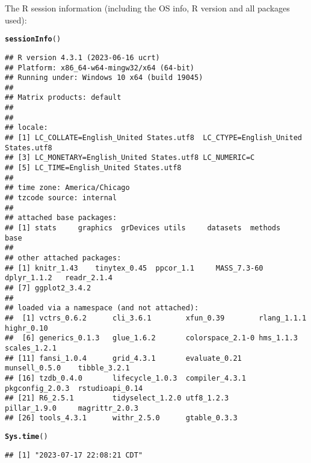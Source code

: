\documentclass{article}\usepackage[]{graphicx}\usepackage[]{xcolor}
\makeatletter
\newcommand{\hlstd}[1]{\textcolor[rgb]{0.345,0.345,0.345}{#1}}%
\newcommand{\hlkwd}[1]{\textcolor[rgb]{0.737,0.353,0.396}{\textbf{#1}}}%
\newenvironment{kframe}{%
 \def\at@end@of@kframe{}%
 \ifinner\ifhmode%
  \def\at@end@of@kframe{\end{minipage}}%
  \begin{minipage}{\columnwidth}%
 \fi\fi%
 \def\FrameCommand##1{\hskip\@totalleftmargin \hskip-\fboxsep
 \colorbox{shadecolor}{##1}\hskip-\fboxsep
     \hskip-\linewidth \hskip-\@totalleftmargin \hskip\columnwidth}%
 \MakeFramed {\advance\hsize-\width
   \@totalleftmargin\z@ \linewidth\hsize
   \@setminipage}}%
 {\par\unskip\endMakeFramed%
 \at@end@of@kframe}
\newenvironment{knitrout}{}{} %
\makeatother
\begin{document}
The R session information (including the OS info, R version and all
packages used):

\begin{knitrout}
\color{fgcolor}\begin{kframe}
\begin{alltt}
\hlkwd{sessionInfo}\hlstd{()}
\end{alltt}
\begin{verbatim}
## R version 4.3.1 (2023-06-16 ucrt)
## Platform: x86_64-w64-mingw32/x64 (64-bit)
## Running under: Windows 10 x64 (build 19045)
## 
## Matrix products: default
## 
## 
## locale:
## [1] LC_COLLATE=English_United States.utf8  LC_CTYPE=English_United States.utf8   
## [3] LC_MONETARY=English_United States.utf8 LC_NUMERIC=C                          
## [5] LC_TIME=English_United States.utf8    
## 
## time zone: America/Chicago
## tzcode source: internal
## 
## attached base packages:
## [1] stats     graphics  grDevices utils     datasets  methods   base     
## 
## other attached packages:
## [1] knitr_1.43    tinytex_0.45  ppcor_1.1     MASS_7.3-60   dplyr_1.1.2   readr_2.1.4  
## [7] ggplot2_3.4.2
## 
## loaded via a namespace (and not attached):
##  [1] vctrs_0.6.2      cli_3.6.1        xfun_0.39        rlang_1.1.1      highr_0.10      
##  [6] generics_0.1.3   glue_1.6.2       colorspace_2.1-0 hms_1.1.3        scales_1.2.1    
## [11] fansi_1.0.4      grid_4.3.1       evaluate_0.21    munsell_0.5.0    tibble_3.2.1    
## [16] tzdb_0.4.0       lifecycle_1.0.3  compiler_4.3.1   pkgconfig_2.0.3  rstudioapi_0.14 
## [21] R6_2.5.1         tidyselect_1.2.0 utf8_1.2.3       pillar_1.9.0     magrittr_2.0.3  
## [26] tools_4.3.1      withr_2.5.0      gtable_0.3.3
\end{verbatim}
\begin{alltt}
\hlkwd{Sys.time}\hlstd{()}
\end{alltt}
\begin{verbatim}
## [1] "2023-07-17 22:08:21 CDT"
\end{verbatim}
\end{kframe}
\end{knitrout}
\end{document}
